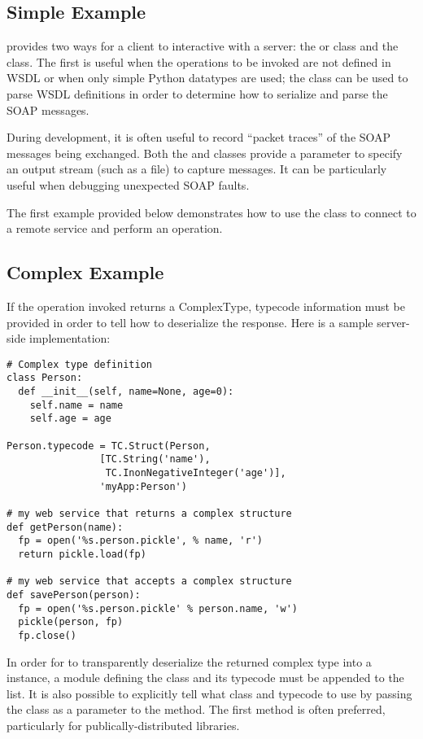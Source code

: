 \subsection{Simple Example}
\ZSI{} provides two ways for a client to interactive with a server:
the  or  class and the
 class.  The first is useful when the operations to be
invoked are not defined in WSDL or when only simple Python datatypes are used;
the  class can be used to parse WSDL definitions in order
to determine how to serialize and parse the SOAP messages.

During development, it is often useful to record ``packet traces'' of
the SOAP messages being exchanged.  Both the  and
 classes provide a  parameter to specify an
output stream (such as a file) to capture messages.  It can be particularly
useful when debugging unexpected SOAP faults.

The first example provided below demonstrates how to use the 
class to connect to a remote service and perform an operation.



\subsection{Complex Example}
If the operation invoked returns a ComplexType, typecode information must
be provided in order to tell \ZSI{} how to deserialize the response.
Here is a sample server-side implementation:

\begin{verbatim}
# Complex type definition
class Person:
  def __init__(self, name=None, age=0):
    self.name = name
    self.age = age

Person.typecode = TC.Struct(Person,
			    [TC.String('name'),
			     TC.InonNegativeInteger('age')],
			    'myApp:Person')

# my web service that returns a complex structure
def getPerson(name):
  fp = open('%s.person.pickle', % name, 'r')
  return pickle.load(fp)

# my web service that accepts a complex structure
def savePerson(person):
  fp = open('%s.person.pickle' % person.name, 'w')
  pickle(person, fp)
  fp.close()
\end{verbatim}

In order for \ZSI{} to transparently deserialize the returned complex type into
a  instance, a module defining the class and its typecode must
be appended to the  list.
It is also possible to explicitly tell \ZSI{} what class and typecode to
use by passing the class as a parameter to the
 method.
The first method is often preferred, particularly for publically-distributed
libraries.

